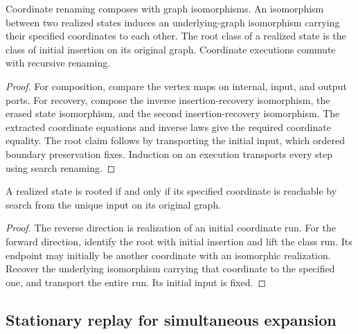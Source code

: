 \begin{lemma}
Coordinate renaming composes with graph isomorphisms. An isomorphism between
two realized states induces an underlying-graph isomorphism carrying their
specified coordinates to each other. The root class of a realized state is
the class of initial insertion on its original graph. Coordinate executions
commute with recursive renaming.
\end{lemma}
\begin{proof}
For composition, compare the vertex maps on internal, input, and output ports.
For recovery, compose the inverse insertion-recovery isomorphism, the erased
state isomorphism, and the second insertion-recovery isomorphism. The extracted
coordinate equations and inverse laws give the required coordinate equality.
The root claim follows by transporting the initial input, which ordered
boundary preservation fixes. Induction on an execution transports every step
using search renaming.
\end{proof}


\begin{theorem}
A realized state is rooted if and only if its specified coordinate is reachable
by search from the unique input on its original graph.
\end{theorem}
\begin{proof}
The reverse direction is realization of an initial coordinate run. For the
forward direction, identify the root with initial insertion and lift the class
run. Its endpoint may initially be another coordinate with an isomorphic
realization. Recover the underlying isomorphism carrying that coordinate to
the specified one, and transport the entire run. Its initial input is fixed.
\end{proof}


\subsection{Stationary replay for simultaneous expansion}

